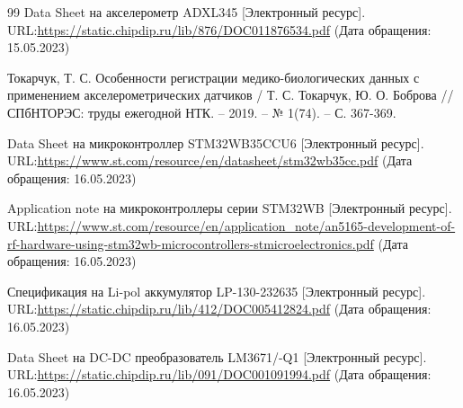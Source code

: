 \newpage
\renewcommand\refname{\centering СПИСОК ИСПОЛЬЗОВАННЫХ ИСТОЧНИКОВ}
\begin {thebibliography} {99}
Data Sheet на акселерометр ADXL345  [Электронный ресурс]. URL:\href{https://static.chipdip.ru/lib/876/DOC011876534.pdf}{https://static.chipdip.ru/lib/876/DOC011876534.pdf} (Дата обращения: 15.05.2023)

Токарчук, Т. С. Особенности регистрации медико-биологических данных с применением акселерометрических датчиков / Т. С. Токарчук, Ю. О. Боброва // СПбНТОРЭС: труды ежегодной НТК. – 2019. – № 1(74). – С. 367-369. 

Data Sheet на микроконтроллер STM32WB35CCU6  [Электронный ресурс]. URL:\href{https://www.st.com/resource/en/datasheet/stm32wb35cc.pdf}{https://www.st.com/resource/en/datasheet/stm32wb35cc.pdf} (Дата обращения: 16.05.2023)


Application note на микроконтроллеры серии STM32WB  [Электронный ресурс]. URL:\href{https://www.st.com/resource/en/application_note/an5165-development-of-rf-hardware-using-stm32wb-microcontrollers-stmicroelectronics.pdf}{https://www.st.com/resource/en/application\_note/an5165-development-of-rf-hardware-using-stm32wb-microcontrollers-stmicroelectronics.pdf} (Дата обращения: 16.05.2023)


Спецификация на Li-pol аккумулятор LP-130-232635  [Электронный ресурс]. URL:\href{https://static.chipdip.ru/lib/412/DOC005412824.pdf}{https://static.chipdip.ru/lib/412/DOC005412824.pdf} (Дата обращения: 16.05.2023)

Data Sheet на DC-DC преобразователь LM3671/-Q1  [Электронный ресурс]. URL:\href{https://static.chipdip.ru/lib/091/DOC001091994.pdf}{https://static.chipdip.ru/lib/091/DOC001091994.pdf} (Дата обращения: 16.05.2023)







\end {thebibliography}



